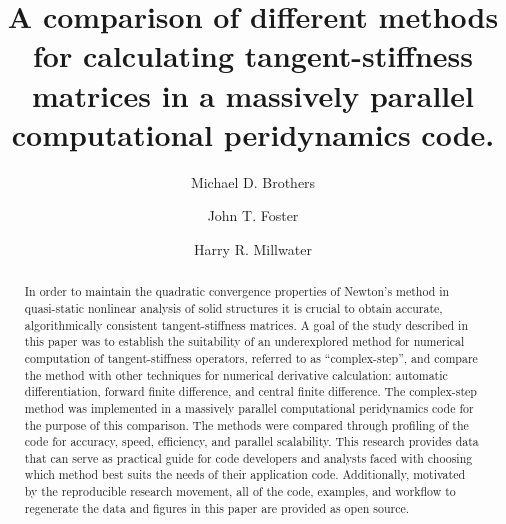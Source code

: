 \documentclass[preprint,12pt]{elsarticle}
\begin{document}
\sloppy

\begin{frontmatter}


\author{Michael D. Brothers}
\author{John T. Foster}
\author{Harry R. Millwater\corref{}}
\address{Mechanical Engineering Department, The University of Texas at San Antonio}


\title{A comparison of different methods for calculating tangent-stiffness matrices in a massively parallel computational peridynamics code.}


\begin{abstract} %

    In order to maintain the quadratic convergence properties of Newton's method in quasi-static nonlinear analysis of solid structures it is crucial to obtain accurate, algorithmically consistent tangent-stiffness matrices. A goal of the study described in this paper was to establish the suitability of an underexplored method for numerical computation of tangent-stiffness operators, referred to as ``complex-step'', and compare the  method with other techniques for numerical derivative calculation: automatic differentiation, forward finite difference, and central finite difference. The complex-step method was implemented in a massively parallel computational peridynamics code for the purpose of this comparison.  The methods were compared through profiling of the code for accuracy, speed, efficiency, and parallel scalability. This research provides data that can serve as practical guide for code developers and analysts faced with choosing which method best suits the needs of their application code.  Additionally, motivated by the reproducible research movement, all of the code, examples, and workflow to regenerate the data and figures in this paper are provided as open source.



\end{abstract}
\end{frontmatter}
\end{document}
